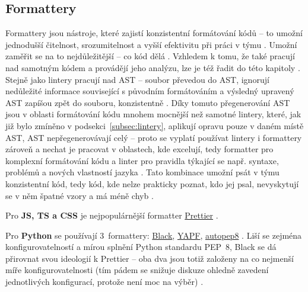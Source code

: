 \subsection{Formattery}

Formattery jsou nástroje, které zajistí konzistentní formátování kódů  -- to umožní jednodušší čitelnost, srozumitelnost a vyšší efektivitu při práci v týmu \cite{linter-medium1}. Umožní zaměřit se na to nejdůležitější -- co kód dělá \cite{linter-restishistory}. Vzhledem k tomu, že také pracují nad samotným kódem a provádějí jeho analýzu, lze je též řadit do této kapitoly \cite{linter-medium1}. Stejně jako lintery pracují nad AST -- soubor převedou do AST, ignorují nedůležité informace související s původním formátováním a výsledný upravený AST zapíšou zpět do souboru, konzistentně \cite{linter-medium1}. Díky tomuto přegenerování AST jsou v oblasti formátování kódu mnohem mocnější než samotné lintery, které, jak již bylo zmíněno v podsekci~\ref{subsec:lintery}, aplikují opravu pouze v daném místě AST, AST nepřegenerovávají celý -- proto se vyplatí používat lintery i formattery zároveň a nechat je pracovat v oblastech, kde excelují, tedy formatter pro komplexní formátování kódu a linter pro pravidla týkající se např. syntaxe, problémů a nových vlastností jazyka \cite{linter-medium2}. Tato kombinace umožní psát v týmu konzistentní kód, tedy kód, kde nelze prakticky poznat, kdo jej psal, nevyskytují se v něm špatné vzory a má méně chyb \cite{linter-restishistory}.

Pro \textbf{JS, TS a CSS} je nejpopulárnější formatter \href{https://prettier.io/}{Prettier} \cite{linter-medium1}. 

Pro \textbf{Python} se používají 3~formattery: \href{https://github.com/psf/black}{Black}, \href{https://github.com/google/yapf}{YAPF}, \href{https://github.com/hhatto/autopep8}{autopep8} \cite{formatter-python, linter-realpython}. Liší se zejména konfigurovatelností a mírou splnění Python standardu PEP~8, Black se dá přirovnat svou ideologií k Prettier -- oba dva jsou totiž založeny na co nejmenší míře konfigurovatelnosti (tím pádem se snižuje diskuze ohledně zavedení jednotlivých konfigurací, protože není moc na výběr) \cite{linter-realpython}.

